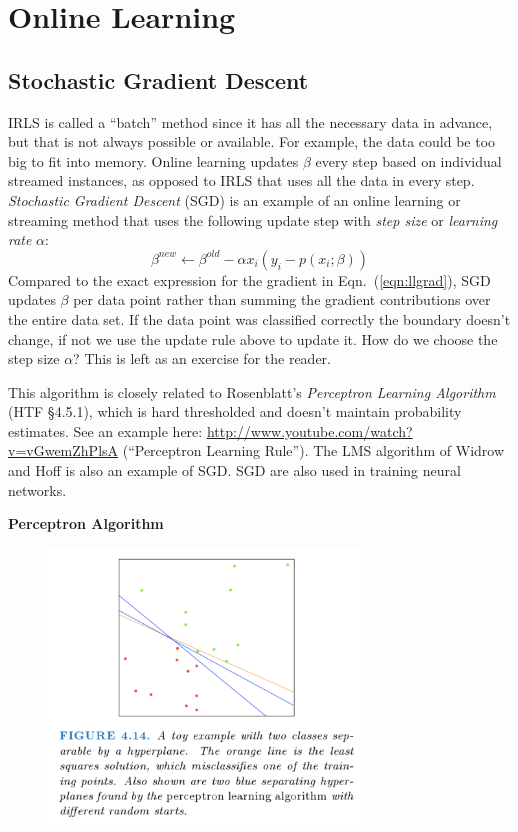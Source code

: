 \documentclass[a4paper]{article}
\begin{document}
\section{Online Learning}
\subsection{Stochastic Gradient Descent}
IRLS is called a ``batch'' method since it has all the necessary data in advance, but that is not always possible or available.  For example, the data could be too big to fit into memory. Online learning updates $\beta$ every step based on individual streamed instances, as opposed to IRLS that uses all the data in every step.  \emph{Stochastic Gradient Descent} (SGD) is an example of an online learning or streaming method that uses the following update step with \emph{step size} or \emph{learning rate} $\alpha$:
$$\beta^{new}\leftarrow \beta^{old}-\alpha x_i (y_i - p(x_i;\beta))$$
Compared to the exact expression for the gradient in Eqn.\ (\ref{eqn:llgrad}), SGD updates $\beta$ per data point rather than summing the gradient contributions over the entire data set.  If the data point was classified correctly the boundary doesn't change, if not we use the update rule above to update it.  How do we choose the step size $\alpha$?  This is left as an exercise for the reader.

This algorithm is closely related to Rosenblatt's \emph{Perceptron Learning Algorithm} (HTF \S4.5.1), which is hard thresholded and doesn't maintain probability estimates.  See an example here: \url{http://www.youtube.com/watch?v=vGwemZhPlsA} (``Perceptron Learning Rule'').  The LMS algorithm of Widrow and Hoff is also an example of SGD. SGD are also used in training neural networks.

\textbf{Perceptron Algorithm }


\begin{figure}
\centering
\includegraphics[width=0.75\textwidth]{sep_hyperplane}
\label{fig:sep_hyperplane}
\end{figure}
\end{document}
